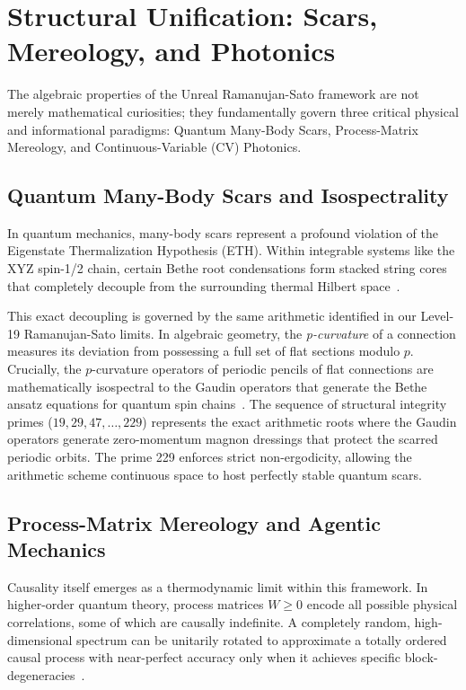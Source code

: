 \section{Structural Unification: Scars, Mereology, and Photonics}

The algebraic properties of the Unreal Ramanujan-Sato framework are not merely mathematical curiosities; they fundamentally govern three critical physical and informational paradigms: Quantum Many-Body Scars, Process-Matrix Mereology, and Continuous-Variable (CV) Photonics.

\subsection{Quantum Many-Body Scars and Isospectrality}
In quantum mechanics, many-body scars represent a profound violation of the Eigenstate Thermalization Hypothesis (ETH). Within integrable systems like the XYZ spin-1/2 chain, certain Bethe root condensations form stacked string cores that completely decouple from the surrounding thermal Hilbert space~\cite{Petrova2024}. 

This exact decoupling is governed by the same arithmetic identified in our Level-19 Ramanujan-Sato limits. In algebraic geometry, the \emph{p-curvature} of a connection measures its deviation from possessing a full set of flat sections modulo $p$. Crucially, the $p$-curvature operators of periodic pencils of flat connections are mathematically isospectral to the Gaudin operators that generate the Bethe ansatz equations for quantum spin chains~\cite{Katz1970, Nakajima2024}. The sequence of structural integrity primes ($19, 29, 47, \dots, 229$) represents the exact arithmetic roots where the Gaudin operators generate zero-momentum magnon dressings that protect the scarred periodic orbits. The prime 229 enforces strict non-ergodicity, allowing the arithmetic scheme continuous space to host perfectly stable quantum scars.

\subsection{Process-Matrix Mereology and Agentic Mechanics}
Causality itself emerges as a thermodynamic limit within this framework. In higher-order quantum theory, process matrices $W \ge 0$ encode all possible physical correlations, some of which are causally indefinite. A completely random, high-dimensional spectrum can be unitarily rotated to approximate a totally ordered causal process with near-perfect accuracy only when it achieves specific block-degeneracies~\cite{Kushwaha2024}.

